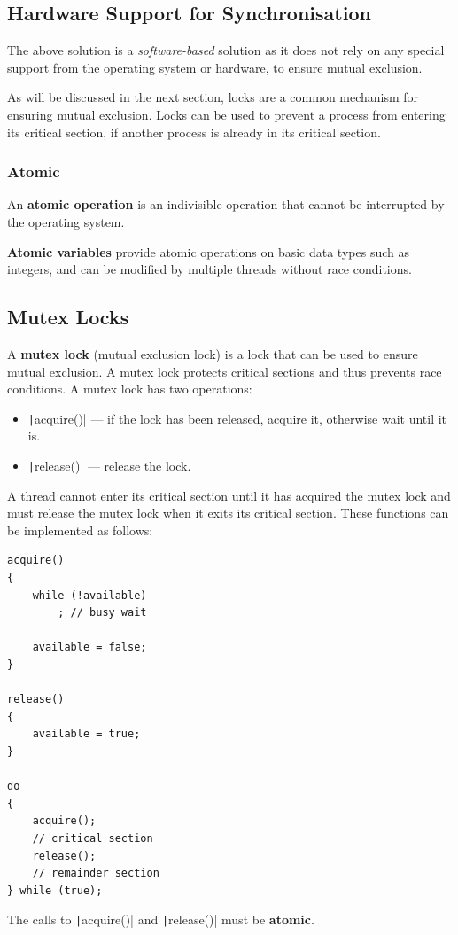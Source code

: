 \documentclass{article}
\begin{document}
\subsection{Hardware Support for Synchronisation}
The above solution is a \textit{software-based} solution as it does not
rely on any special support from the operating system or hardware, to
ensure mutual exclusion.

As will be discussed in the next section, locks are a common mechanism
for ensuring mutual exclusion. Locks can be used to prevent a process
from entering its critical section, if another process is already in
its critical section.
\subsubsection{Atomic}
An \textbf{atomic operation} is an indivisible operation that cannot be
interrupted by the operating system.

\textbf{Atomic variables} provide atomic operations on basic data types
such as integers, and can be modified by multiple threads without race
conditions.
\subsection{Mutex Locks}
A \textbf{mutex lock} (mutual exclusion lock) is a lock that can be
used to ensure mutual exclusion. A mutex lock protects critical
sections and thus prevents race conditions. A mutex lock has two
operations:
\begin{itemize}
    \item \texttt|acquire()| --- if the lock has been released,
          acquire it, otherwise wait until it is.
    \item \texttt|release()| --- release the lock.
\end{itemize}
A thread cannot enter its critical section until it has acquired the
mutex lock and must release the mutex lock when it exits its critical
section. These functions can be implemented as follows:
\begin{verbatim}
acquire()
{
    while (!available)
        ; // busy wait

    available = false;
}

release()
{
    available = true;
}

do
{
    acquire();
    // critical section
    release();
    // remainder section
} while (true);
\end{verbatim}
The calls to \texttt|acquire()| and \texttt|release()|
must be \textbf{atomic}.
\end{document}
